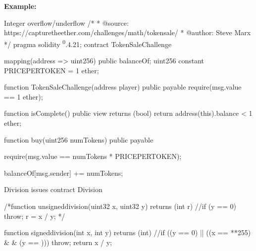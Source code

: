 \documentclass{article}
\begin{document}
\textbf{Example:} 

Integer overflow/underflow
/*
* @source: https://capturetheether.com/challenges/math/token\textendash sale/
* @author: Steve Marx
*/
pragma solidity \textsuperscript0.4.21;
contract TokenSaleChallenge {
    mapping(address => uint256) public balanceOf;
    uint256 constant PRICE\textunderscore PER\textunderscore TOKEN = 1 ether;

    function TokenSaleChallenge(address \textunderscore player) public payable {
        require(msg.value == 1 ether);
    }

    function isComplete() public view returns (bool) {
        return address(this).balance < 1 ether;
    }

    function buy(uint256 numTokens) public payable {
        require(msg.value == numTokens * PRICE\textunderscore PER\textunderscore TOKEN);

        balanceOf[msg.sender] += numTokens;
    }
}

Division issues
contract Division {

    /*function unsigned\textunderscore division(uint32 x, uint32 y) returns (int r) {
      //if (y == 0) { throw; }
      r = x / y;
    }*/

    function signed\textunderscore division(int x, int y) returns (int) {
      //if ((y == 0) || ((x == **255) \& \&  (y == ))) { throw; }
      return x / y;
    }

}
\end{document}
